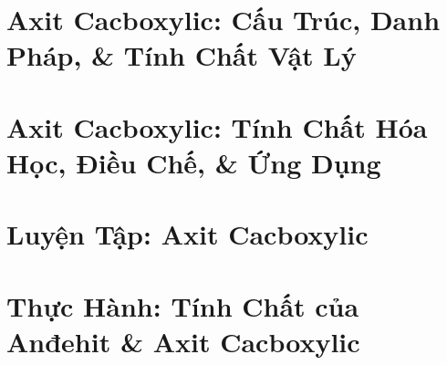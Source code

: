 \documentclass[oneside]{book}
\numberwithin{equation}{section}
\begin{document}

\section{Axit Cacboxylic: Cấu Trúc, Danh Pháp, \& Tính Chất Vật Lý}


\section{Axit Cacboxylic: Tính Chất Hóa Học, Điều Chế, \& Ứng Dụng}


\section{Luyện Tập: Axit Cacboxylic}


\section{Thực Hành: Tính Chất của Anđehit \& Axit Cacboxylic}


\printbibliography[heading=bibintoc]
	
\end{document}
